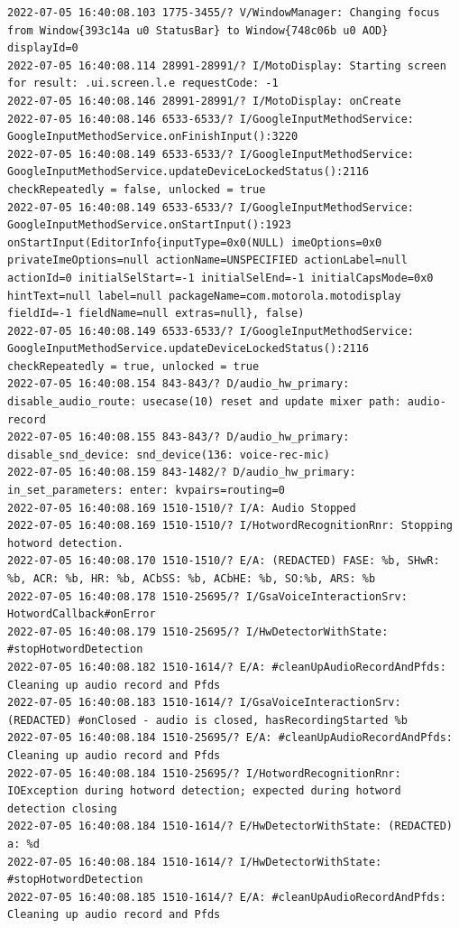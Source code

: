 \documentclass[a4paper,12pt]{book}
\begin{document}
\begin{lstlisting}
2022-07-05 16:40:08.103 1775-3455/? V/WindowManager: Changing focus from Window{393c14a u0 StatusBar} to Window{748c06b u0 AOD} displayId=0
2022-07-05 16:40:08.114 28991-28991/? I/MotoDisplay: Starting screen for result: .ui.screen.l.e requestCode: -1
2022-07-05 16:40:08.146 28991-28991/? I/MotoDisplay: onCreate
2022-07-05 16:40:08.146 6533-6533/? I/GoogleInputMethodService: GoogleInputMethodService.onFinishInput():3220 
2022-07-05 16:40:08.149 6533-6533/? I/GoogleInputMethodService: GoogleInputMethodService.updateDeviceLockedStatus():2116 checkRepeatedly = false, unlocked = true
2022-07-05 16:40:08.149 6533-6533/? I/GoogleInputMethodService: GoogleInputMethodService.onStartInput():1923 onStartInput(EditorInfo{inputType=0x0(NULL) imeOptions=0x0 privateImeOptions=null actionName=UNSPECIFIED actionLabel=null actionId=0 initialSelStart=-1 initialSelEnd=-1 initialCapsMode=0x0 hintText=null label=null packageName=com.motorola.motodisplay fieldId=-1 fieldName=null extras=null}, false)
2022-07-05 16:40:08.149 6533-6533/? I/GoogleInputMethodService: GoogleInputMethodService.updateDeviceLockedStatus():2116 checkRepeatedly = true, unlocked = true
2022-07-05 16:40:08.154 843-843/? D/audio_hw_primary: disable_audio_route: usecase(10) reset and update mixer path: audio-record
2022-07-05 16:40:08.155 843-843/? D/audio_hw_primary: disable_snd_device: snd_device(136: voice-rec-mic)
2022-07-05 16:40:08.159 843-1482/? D/audio_hw_primary: in_set_parameters: enter: kvpairs=routing=0
2022-07-05 16:40:08.169 1510-1510/? I/A: Audio Stopped
2022-07-05 16:40:08.169 1510-1510/? I/HotwordRecognitionRnr: Stopping hotword detection.
2022-07-05 16:40:08.170 1510-1510/? E/A: (REDACTED) FASE: %b, SHwR: %b, ACR: %b, HR: %b, ACbSS: %b, ACbHE: %b, SO:%b, ARS: %b
2022-07-05 16:40:08.178 1510-25695/? I/GsaVoiceInteractionSrv: HotwordCallback#onError
2022-07-05 16:40:08.179 1510-25695/? I/HwDetectorWithState: #stopHotwordDetection
2022-07-05 16:40:08.182 1510-1614/? E/A: #cleanUpAudioRecordAndPfds: Cleaning up audio record and Pfds
2022-07-05 16:40:08.183 1510-1614/? I/GsaVoiceInteractionSrv: (REDACTED) #onClosed - audio is closed, hasRecordingStarted %b
2022-07-05 16:40:08.184 1510-25695/? E/A: #cleanUpAudioRecordAndPfds: Cleaning up audio record and Pfds
2022-07-05 16:40:08.184 1510-25695/? I/HotwordRecognitionRnr: IOException during hotword detection; expected during hotword detection closing
2022-07-05 16:40:08.184 1510-1614/? E/HwDetectorWithState: (REDACTED) a: %d
2022-07-05 16:40:08.184 1510-1614/? I/HwDetectorWithState: #stopHotwordDetection
2022-07-05 16:40:08.185 1510-1614/? E/A: #cleanUpAudioRecordAndPfds: Cleaning up audio record and Pfds

\end{lstlisting}
\end{document}
